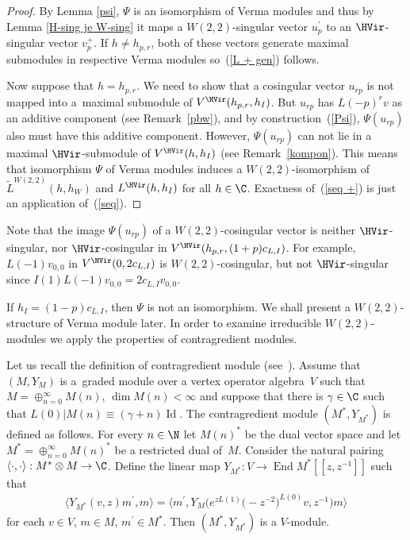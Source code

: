 \begin{proof}
By Lemma \ref{psi}, $\Psi$ is an isomorphism of Verma modules and thus by Lemma \ref{H-sing je W-sing} it maps a $W(2,2) $-singular vector $u^{\prime}_p$ to an $\HVir$-singular vector $v_p^+$. If $h\neq h_{p,r}$, both of these vectors generate maximal submodules in respective Verma modules so~(\ref{L + gen}) follows.

Now suppose that $h=h_{p,r}$. We need to show that a cosingular vector $u_{rp}$ is not mapped into a~maximal submodule of $V^\HVir(h_{p,r},h_I)$. But $u_{rp}$ has $L(-p) ^{r}v$ as an additive component (see Remark~\ref{pbw}), and by construction~(\ref{Psi}), $\Psi(u_{rp})$ also must have this additive component. However, $\Psi(u_{rp})$ can not lie in a maximal $\HVir$-submodule of $V^{\HVir}(h,h_{I}) $ (see Remark~\ref{kompon}). This means that isomorphism $\Psi$ of Verma modules induces a $W(2,2) $-isomorphism of $\widetilde{L}^{W(2,2)}(h,h_{W}) $ and $L^{\HVir}(h,h_{I}) $ for all $h\in\C$. Exactness of~(\ref{seq +}) is just an application of~(\ref{seq}).
\end{proof}

\begin{Remark}
Note that the image $\Psi(u_{rp}) $ of a $W(2,2)$-cosingular vector is neither $\HVir$-singular, nor $\HVir$-cosingular in $V^{\HVir}(h_{p,r},(1+p)c_{L,I})$. For example, $L(-1) v_{0,0}$ in $V^{\HVir}(0,2c_{L,I})$ is $W(2,2)$-cosingular, but not $\HVir$-singular since $I(1) L(-1) v_{0,0}=2c_{L,I}v_{0,0}$.
\end{Remark}

If $h_{I}=(1-p) c_{L,I}$, then $\Psi $ is not an isomorphism. We shall present a $W(2,2)$-structure of Verma module later. In order to examine irreducible $W(2,2)$-modules we apply the properties of contragredient modules.

Let us recall the def\/inition of contragredient module (see~\cite{FHL}). Assume that $(M,Y_{M})$ is a~graded module over a vertex operator algebra~$V$ such that $M=\oplus _{n=0}^{\infty }M(n)$, $\dim M(n)<\infty $ and suppose that there is $\gamma \in {\C}$ such that $L(0)|M(n)\equiv (\gamma +n)\operatorname{Id}$. The contragredient module $( M^{\ast },Y_{M^{\ast}}) $ is def\/ined as follows. For every $n\in {\N}$ let $M(n)^{\ast }$ be the dual vector space and let $M^{\ast }=\oplus _{n=0}^{\infty }M(n)^{\ast }$ be a restricted dual of~$M$. Consider the natural pairing $\langle \cdot ,\cdot \rangle :M^{\ast }\otimes M\rightarrow \C$. Def\/ine the linear map $Y_{M^{\ast }}\colon V\rightarrow \operatorname{End} M^{\ast }[[z,z^{-1}]]$ such that
\begin{gather}
\langle Y_{M^{\ast }}(v,z)m^{\prime },m\rangle =\big\langle m^{\prime },Y_{M}\big(e^{zL(1)}\big({-}z^{-2}\big)^{L(0)}v,z^{-1}\big)m\big\rangle \label{contra}
\end{gather}
for each $v\in V$, $m\in M$, $m^{\prime }\in M^{\ast }$. Then $(M^{\ast },Y_{M^{\ast }}) $ is a $V$-module.

